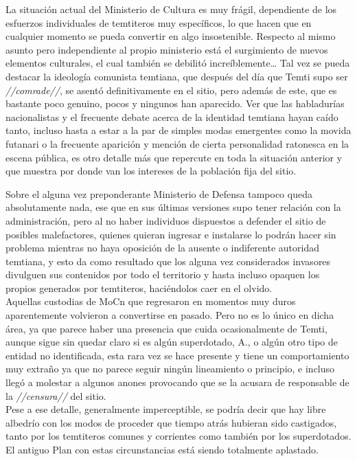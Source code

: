 \documentclass[
  spanish,
]{book}
\begin{document}
La situación actual del Ministerio de Cultura es muy frágil, dependiente de los esfuerzos individuales de temtiteros muy específicos, lo que hacen que en cualquier momento se pueda convertir en algo insostenible. Respecto al mismo asunto pero independiente al propio ministerio está el surgimiento de nuevos elementos culturales, el cual también se debilitó increíblemente\ldots{} Tal vez se pueda destacar la ideología comunista temtiana, que después del día que Temti supo ser \emph{//comrade//}, se asentó definitivamente en el sitio, pero además de este, que es bastante poco genuino, pocos y ningunos han aparecido. Ver que las habladurías nacionalistas y el frecuente debate acerca de la identidad temtiana hayan caído tanto, incluso hasta a estar a la par de simples modas emergentes como la movida futanari o la frecuente aparición y mención de cierta personalidad ratonesca en la escena pública, es otro detalle más que repercute en toda la situación anterior y que muestra por donde van los intereses de la población fija del sitio.

Sobre el alguna vez preponderante Ministerio de Defensa tampoco queda absolutamente nada, ese que en sus últimas versiones supo tener relación con la administración, pero al no haber individuos dispuestos a defender el sitio de posibles malefactores, quienes quieran ingresar e instalarse lo podrán hacer sin problema mientras no haya oposición de la ausente o indiferente autoridad temtiana, y esto da como resultado que los alguna vez considerados invasores divulguen sus contenidos por todo el territorio y hasta incluso opaquen los propios generados por temtiteros, haciéndolos caer en el olvido.\\
Aquellas custodias de MoCn que regresaron en momentos muy duros aparentemente volvieron a convertirse en pasado. Pero no es lo único en dicha área, ya que parece haber una presencia que cuida ocasionalmente de Temti, aunque sigue sin quedar claro si es algún superdotado, A., o algún otro tipo de entidad no identificada, esta rara vez se hace presente y tiene un comportamiento muy extraño ya que no parece seguir ningún lineamiento o principio, e incluso llegó a molestar a algunos anones provocando que se la acusara de responsable de la \emph{//censura//} del sitio.\\
Pese a ese detalle, generalmente imperceptible, se podría decir que hay libre albedrío con los modos de proceder que tiempo atrás hubieran sido castigados, tanto por los temtiteros comunes y corrientes como también por los superdotados. El antiguo Plan con estas circunstancias está siendo totalmente aplastado.
\end{document}

